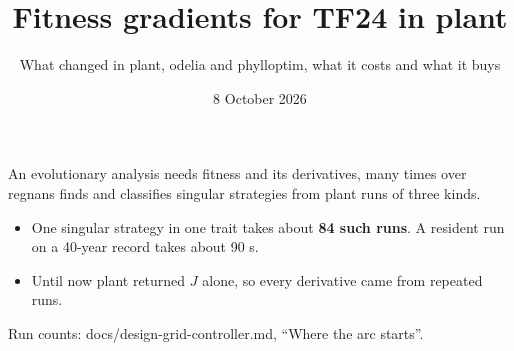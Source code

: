 \documentclass[aspectratio=169,10pt]{beamer}
\title{Fitness gradients for TF24 in plant}
\subtitle{What changed in plant, odelia and phylloptim, what it costs and what it buys}
\date{8 October 2026}
\newcommand{\src}[1]{\par\vfill{\tiny\color{quiet} #1}}
\begin{document}
\begin{frame}
  \titlepage
\end{frame}

\begin{frame}{An evolutionary analysis needs fitness and its derivatives, many times over}
  \small
  regnans finds and classifies singular strategies from plant runs of three kinds.
  \medskip

  \medskip

  \begin{itemize}
    \item One singular strategy in one trait takes about \textbf{84 such runs}. A resident run on a
      40-year record takes about 90 s.
    \item Until now plant returned $J$ alone, so every derivative came from repeated runs.
  \end{itemize}
  \src{Run counts: docs/design-grid-controller.md, ``Where the arc starts''.}
\end{frame}
\end{document}
